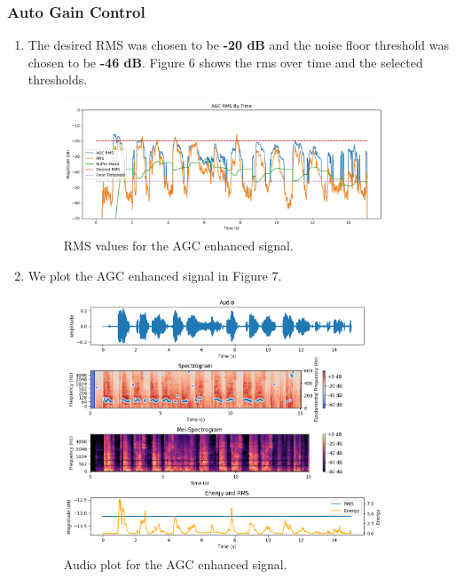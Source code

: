 \subsubsection{Auto Gain Control}
\begin{enumerate}
  \item The desired RMS was chosen to be \textbf{-20 dB} and the noise floor threshold was chosen to be \textbf{-46 dB}.
  Figure 6 shows the rms over time and the selected thresholds.
  \begin{figure}
    \label{fig:agc_rms}
    \centering
    \includegraphics[width=0.9\textwidth]{agc_rms_full.png}
    \caption{RMS values for the AGC enhanced signal.}
  \end{figure}
  
  \item We plot the AGC enhanced signal in Figure 7.
  \begin{figure}
    \label{fig:agc_plot}
    \centering
    \includegraphics[width=0.9\textwidth]{agc_plot.png}
    \caption{Audio plot for the AGC enhanced signal.}
  \end{figure}


\end{enumerate}
